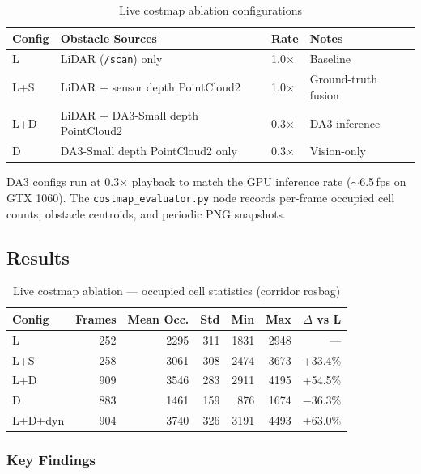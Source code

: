 \documentclass[11pt,a4paper]{article}
\begin{document}
\begin{table}[h]
\centering
\caption{Live costmap ablation configurations}
\label{tab:live-configs}
\begin{tabular}{llll}
\toprule
\textbf{Config} & \textbf{Obstacle Sources} & \textbf{Rate} & \textbf{Notes} \\
\midrule
L   & LiDAR (\texttt{/scan}) only & 1.0$\times$ & Baseline \\
L+S & LiDAR + sensor depth PointCloud2 & 1.0$\times$ & Ground-truth fusion \\
L+D & LiDAR + DA3-Small depth PointCloud2 & 0.3$\times$ & DA3 inference \\
D   & DA3-Small depth PointCloud2 only & 0.3$\times$ & Vision-only \\
\bottomrule
\end{tabular}
\end{table}

DA3 configs run at 0.3$\times$ playback to match the GPU inference rate
($\sim$6.5\,fps on GTX 1060). The \texttt{costmap\_evaluator.py} node
records per-frame occupied cell counts, obstacle centroids, and periodic
PNG snapshots.

\subsection{Results}

\begin{table}[h]
\centering
\caption{Live costmap ablation --- occupied cell statistics (corridor rosbag)}
\label{tab:live-results}
\begin{tabular}{lrrrrrr}
\toprule
\textbf{Config} & \textbf{Frames} & \textbf{Mean Occ.} & \textbf{Std} & \textbf{Min} & \textbf{Max} & \textbf{$\Delta$ vs L} \\
\midrule
L       & 252 & 2295 & 311 & 1831 & 2948 & ---      \\
L+S     & 258 & 3061 & 308 & 2474 & 3673 & +33.4\% \\
L+D     & 909 & 3546 & 283 & 2911 & 4195 & +54.5\% \\
D       & 883 & 1461 & 159 &  876 & 1674 & $-$36.3\% \\
L+D+dyn & 904 & 3740 & 326 & 3191 & 4493 & +63.0\% \\
\bottomrule
\end{tabular}
\end{table}

\subsubsection{Key Findings}
\end{document}
